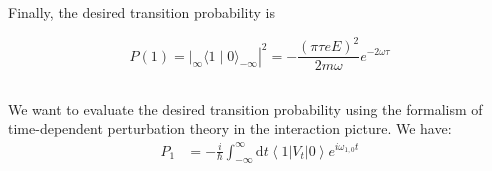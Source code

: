 \documentclass[12pt]{article}
\begin{document}
Finally, the desired transition probability is

$$
P(1)=\left.\left.\right|_{\infty}\langle 1 \mid 0\rangle_{-\infty}\right|^{2}=-\frac{(\pi \tau e E)^{2}}{2 m \omega} e^{-2 \omega \tau}
$$
\subsection{}
We want to evaluate the desired transition probability using the formalism of time-dependent perturbation theory in the interaction picture. We have:
\begin{equation}
  \begin{aligned}
    P_{1} &= -\frac{i}{\hbar} \int_{-\infty}^{\infty} \mathrm{d} t\left\langle 1\left|V_{t}\right| 0\right\rangle e^{i \omega_{1, 0} t} \\
\end{aligned}
\end{equation}
\end{document}
